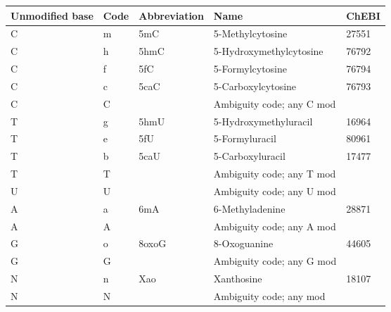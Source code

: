 \documentclass[10pt]{article}
\begin{document}
\begin{description}
\begin{center}
\begin{tabular}{lllll}
{\bf Unmodified base} & {\bf Code} & {\bf Abbreviation} & {\bf Name} & {\bf ChEBI} \\
\hline
C & m & 5mC   & 5-Methylcytosine        & 27551 \\
C & h & 5hmC  & 5-Hydroxymethylcytosine & 76792 \\
C & f & 5fC   & 5-Formylcytosine        & 76794 \\
C & c & 5caC  & 5-Carboxylcytosine      & 76793 \\
C & C &       & Ambiguity code; any C mod & \\
\hline
T & g & 5hmU  & 5-Hydroxymethyluracil   & 16964 \\
T & e & 5fU   & 5-Formyluracil          & 80961 \\
T & b & 5caU  & 5-Carboxyluracil        & 17477 \\
T & T &       & Ambiguity code; any T mod & \\
\hline
U & U &       & Ambiguity code; any U mod & \\
\hline
A & a & 6mA   & 6-Methyladenine         & 28871 \\
A & A &       & Ambiguity code; any A mod & \\
\hline
G & o & 8oxoG & 8-Oxoguanine            & 44605 \\
G & G &       & Ambiguity code; any G mod & \\
\hline
N & n & Xao   & Xanthosine              & 18107 \\
N & N &       & Ambiguity code; any mod & \\
\end{tabular}
\end{center}


\end{description}
\end{document}
